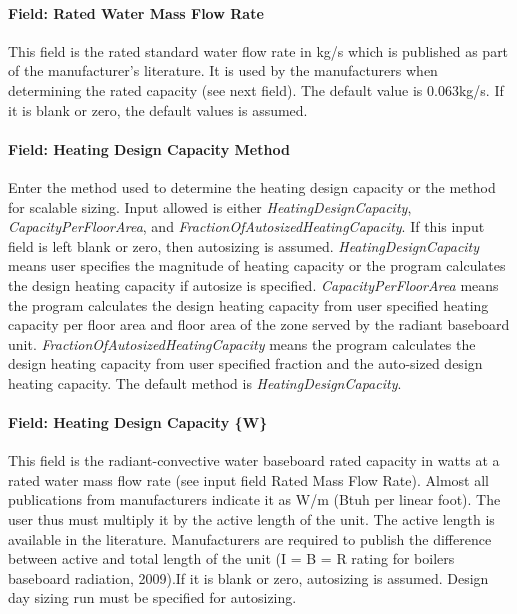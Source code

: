 \paragraph{Field: Rated Water Mass Flow Rate}

This field is the rated standard water flow rate in kg/s which is published as part of the manufacturer's literature. It is used by the manufacturers when determining the rated capacity (see next field). The default value is 0.063kg/s. If it is blank or zero, the default values is assumed.

\paragraph{Field: Heating Design Capacity Method}\label{field-heating-design-capacity-method-000}

Enter the method used to determine the heating design capacity or the method for scalable sizing. Input allowed is either \emph{HeatingDesignCapacity}, \emph{CapacityPerFloorArea}, and \emph{FractionOfAutosizedHeatingCapacity}. If this input field is left blank or zero, then autosizing is assumed. \emph{HeatingDesignCapacity} means user specifies the magnitude of heating capacity or the program calculates the design heating capacity if autosize is specified. \emph{CapacityPerFloorArea} means the program calculates the design heating capacity from user specified heating capacity per floor area and floor area of the zone served by the radiant baseboard unit. \emph{FractionOfAutosizedHeatingCapacity} means the program calculates the design heating capacity from user specified fraction and the auto-sized design heating capacity. The default method is \emph{HeatingDesignCapacity}.

\paragraph{Field: Heating Design Capacity \{W\}}\label{field-heating-design-capacity-w-000}

This field is the radiant-convective water baseboard rated capacity in watts at a rated water mass flow rate (see input field Rated Mass Flow Rate). Almost all publications from manufacturers indicate it as W/m (Btuh per linear foot). The user thus must multiply it by the active length of the unit. The active length is available in the literature. Manufacturers are required to publish the difference between active and total length of the unit (I = B = R rating for boilers baseboard radiation, 2009).If it is blank or zero, autosizing is assumed. Design day sizing run must be specified for autosizing.

